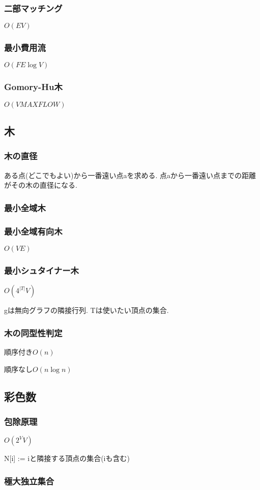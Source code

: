 \subsubsection{二部マッチング}
$O(EV)$\par


\subsubsection{最小費用流}
$O(FE\log V)$\par


\subsubsection{Gomory-Hu木}
$O(V MAXFLOW)$


\subsection{木}
\subsubsection{木の直径}
ある点(どこでもよい)から一番遠い点aを求める. 点aから一番遠い点までの距離がその木の直径になる.\par
\subsubsection{最小全域木}

\subsubsection{最小全域有向木}
$O(VE)$

\subsubsection{最小シュタイナー木}
$O(4^{|T|}V)$ \par
gは無向グラフの隣接行列. Tは使いたい頂点の集合.\par

\subsubsection{木の同型性判定}
順序付き$O(n)$\par
順序なし$O(n\log n)$


\subsection{彩色数}
\subsubsection{包除原理}
$O(2^VV)$\par
N[i] := iと隣接する頂点の集合(iも含む)\par

\subsubsection{極大独立集合}

